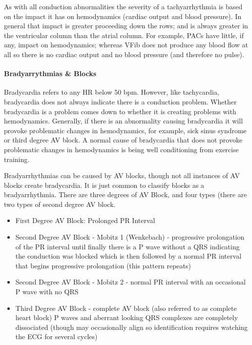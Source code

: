 As with all conduction abnormalities the severity of a tachyarrhythmia is based on the impact it has on hemodynamics (cardiac output and blood pressure). In general that impact is greater proceeding down the rows; and is always greater in the ventricular column than the atrial column. For example, PACs have little, if any, impact on hemodynamics; whereas VFib does not produce any blood flow at all so there is no cardiac output and no blood pressure (and therefore no pulse). 



\paragraph{Bradyarrythmias \& Blocks}

Bradycardia refers to any HR below 50 bpm. However, like tachycardia, bradycardia does not always indicate there is a conduction problem. Whether bradycardia is a problem comes down to whether it is creating problems with hemodynamics. Generally, if there is an abnormality causing bradycardia it will provoke problematic changes in hemodynamics, for example, sick sinus syndrome or third degree AV block. A normal cause of bradycardia that does not provoke problematic changes in hemodynamics is being well conditioning from exercise training.

Bradyarrhythmias can be caused by AV blocks, though not all instances of AV blocks create bradycardia. It is just common to classify blocks as a bradyarrhythmia. There are three degrees of AV Block, and four types (there are two types of second degree AV block.

\begin{itemize}
    \item First Degree AV Block: Prolonged PR Interval
    \item Second Degree AV Block - Mobitz 1 (Wenkebach) - progressive prolongation of the PR interval until finally there is a P wave without a QRS indicating the conduction was blocked which is then followed by a normal PR interval that begins progressive prolongation (this pattern repeats)
    \item Second Degree AV Block - Mobitz 2 - normal PR interval with an occasional P wave with no QRS
    \item Third Degree AV Block - complete AV block (also referred to as complete heart block) P waves and aberrant looking QRS complexes are completely dissociated (though may occasionally align so identification requires watching the ECG for several cycles)
\end{itemize}

